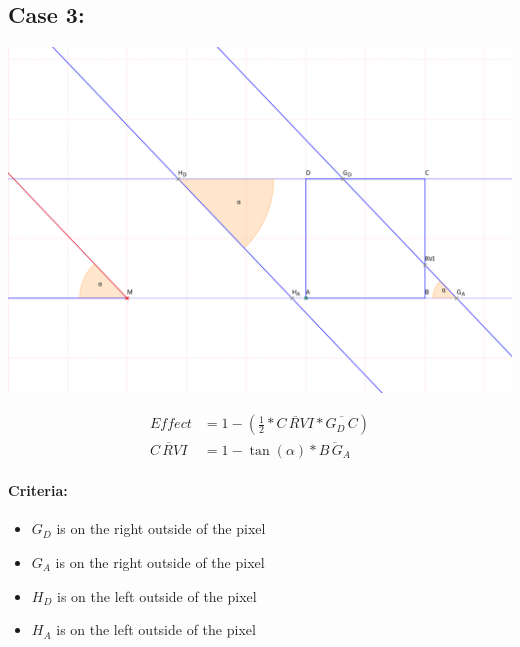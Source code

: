 \documentclass[a4paper,10pt,fleqn]{scrartcl}
\numberwithin{equation}{subsection}
\begin{document}
\subsection{Case 3:}
\begin{minipage}{\textwidth}
\includegraphics[width=\textwidth]{case3}
\end{minipage}
\begin{align}
Effect &= 1 - (\frac{1}{2} * \overline{C\,RVI} * \overline{G_D\,C})\\
\overline{C\,RVI} &=  1 - \tan(\alpha) * \overline{B\,G_A}
\end{align}
\paragraph{Criteria:}
\begin{itemize}
 \item $G_D$ is on the right outside of the pixel
 \item $G_A$ is on the right outside of the pixel
 \item $H_D$ is on the left outside of the pixel
 \item $H_A$ is on the left outside of the pixel
\end{itemize}
\end{document}
